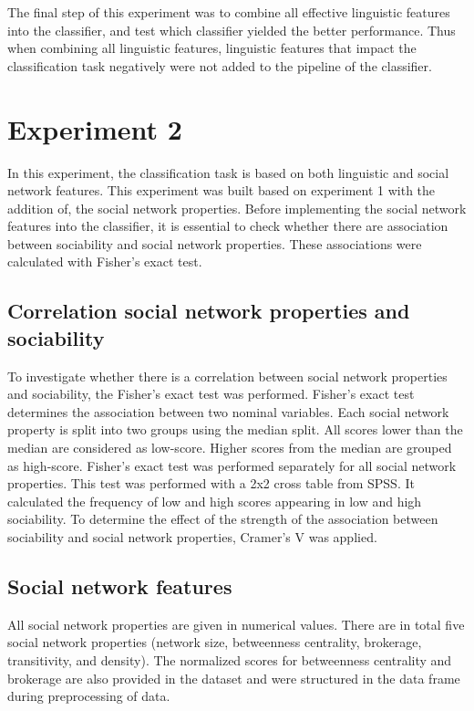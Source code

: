 \documentclass[
10pt, %
a4paper, %
oneside, %
headinclude,footinclude, %
] {book}%
\begin{document}
The final step of this experiment was to combine all effective linguistic features into the classifier, and test which classifier yielded the better performance. Thus when combining all linguistic features, linguistic features that impact the classification task negatively were not added to the pipeline of the classifier.

\section{Experiment 2}
In this experiment, the classification task is based on both linguistic and social network features. This experiment was built based on experiment 1 with the addition of, the social network properties. Before implementing the social network features into the classifier, it is essential to check whether there are association between sociability and social network properties. These associations were calculated with Fisher’s exact test. 

\subsection{Correlation social network properties and sociability}
To investigate whether there is a correlation between social network properties and sociability, the Fisher’s exact test was performed. Fisher’s exact test determines the association between two nominal variables. Each social network property is split into two groups using the median split. All scores lower than the median are considered as low-score. Higher scores from the median are grouped as high-score. Fisher's exact test was performed separately for all social network properties. This test was performed with a 2x2 cross table from SPSS. It calculated the frequency of low and high scores appearing in low and high sociability. To determine the effect of the strength of the association between sociability and social network properties, Cramer’s V was applied.

\subsection{Social network features}
All social network properties are given in numerical values. There are in total five social network properties (network size, betweenness centrality, brokerage, transitivity, and density). The normalized scores for betweenness centrality and brokerage are also provided in the dataset and were structured in the data frame during preprocessing of data.
\end{document}
